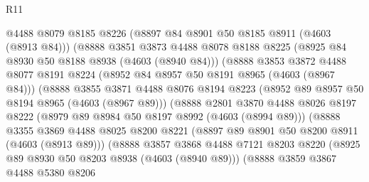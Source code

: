 \begin{lexlean}{R11}
\begin{coremodule}
                          @4488
                          @8079
                          @8185
                          @8226
                          (@8897 @84 @8901 @50 @8185 @8911 (@4603 (@8913 @84)))
                          (@8888
                            @3851
                            @3873
                            @4488
                            @8078
                            @8188
                            @8225
                            (@8925 @84 @8930 @50 @8188 @8938 (@4603 (@8940 @84)))
                            (@8888
                              @3853
                              @3872
                              @4488
                              @8077
                              @8191
                              @8224
                              (@8952 @84 @8957 @50 @8191 @8965 (@4603 (@8967 @84)))
                              (@8888
                                @3855
                                @3871
                                @4488
                                @8076
                                @8194
                                @8223
                                (@8952 @89 @8957 @50 @8194 @8965 (@4603 (@8967 @89)))
                                (@8888
                                  @2801
                                  @3870
                                  @4488
                                  @8026
                                  @8197
                                  @8222
                                  (@8979 @89 @8984 @50 @8197 @8992 (@4603 (@8994 @89)))
                                  (@8888
                                    @3355
                                    @3869
                                    @4488
                                    @8025
                                    @8200
                                    @8221
                                    (@8897 @89 @8901 @50 @8200 @8911 (@4603 (@8913 @89)))
                                    (@8888
                                      @3857
                                      @3868
                                      @4488
                                      @7121
                                      @8203
                                      @8220
                                      (@8925 @89 @8930 @50 @8203 @8938 (@4603 (@8940 @89)))
                                      (@8888
                                        @3859
                                        @3867
                                        @4488
                                        @5380
                                        @8206

\end{coremodule}
\end{lexlean}
